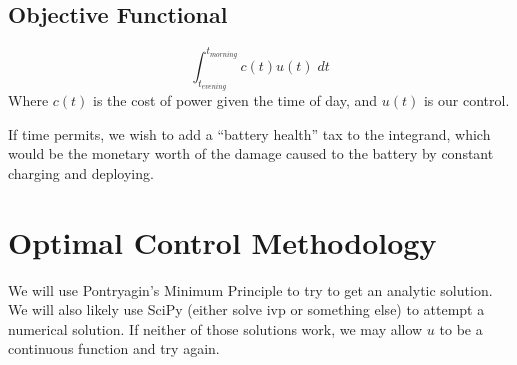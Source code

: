 \documentclass[11pt, letterpaper]{article}
\begin{document}
\subsection{Objective Functional}
    \[ \int_{t_{evening}}^{t_{morning}} c(t) u(t) \; dt \]
    Where $c(t)$ is the cost of power given the time of day, and $u(t)$ is our control.

    If time permits, we wish to add a ``battery health'' tax to the integrand, which would be the monetary worth of the damage caused to the battery by constant charging and deploying.

\section{Optimal Control Methodology}
    We will use Pontryagin's Minimum Principle to try to get an analytic solution. We will also likely use SciPy (either solve ivp or something else) to attempt a numerical solution. If neither of those solutions work, we may allow $u$ to be a continuous function and try again.
    
\end{document}
